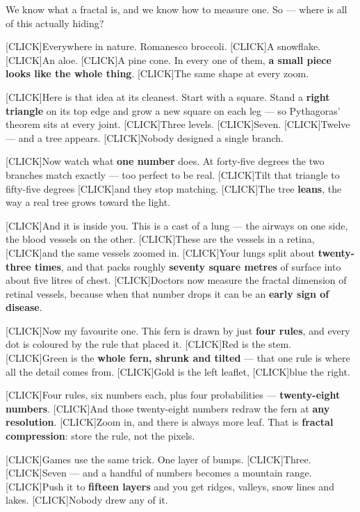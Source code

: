 \documentclass[12pt,a4paper]{article}
\newcommand{\cue}{\textcolor{RayColor}{\textsf{\footnotesize[CLICK]}}\hspace{0.3em}}
\newcommand{\stress}[1]{\textbf{#1}}
\begin{document}
\vspace{0.3cm}

We know what a fractal is, and we know how to measure one. So --- where is all of
this actually hiding?

\cue Everywhere in nature. Romanesco broccoli. \cue A snowflake. \cue An aloe.
\cue A pine cone. In every one of them, \stress{a small piece looks like the whole
thing}. \cue The same shape at every zoom.

\cue Here is that idea at its cleanest. Start with a square. Stand a
\stress{right triangle} on its top edge and grow a new square on each leg --- so
Pythagoras' theorem sits at every joint. \cue Three levels. \cue Seven.
\cue Twelve --- and a tree appears. \cue Nobody designed a single branch.

\cue Now watch what \stress{one number} does. At forty-five degrees the two
branches match exactly --- too perfect to be real. \cue Tilt that triangle to
fifty-five degrees \cue and they stop matching. \cue The tree \stress{leans}, the
way a real tree grows toward the light.

\cue And it is inside you. This is a cast of a lung --- the airways on one side,
the blood vessels on the other. \cue These are the vessels in a retina,
\cue and the same vessels zoomed in. \cue Your lungs split about
\stress{twenty-three times}, and that packs roughly \stress{seventy square metres}
of surface into about five litres of chest. \cue Doctors now measure the fractal
dimension of retinal vessels, because when that number drops it can be an
\stress{early sign of disease}.

\cue Now my favourite one. This fern is drawn by just \stress{four rules}, and
every dot is coloured by the rule that placed it. \cue Red is the stem.
\cue Green is the \stress{whole fern, shrunk and tilted} --- that one rule is
where all the detail comes from. \cue Gold is the left leaflet, \cue blue the
right.

\cue Four rules, six numbers each, plus four probabilities --- \stress{twenty-eight
numbers}. \cue And those twenty-eight numbers redraw the fern at \stress{any
resolution}. \cue Zoom in, and there is always more leaf. That is \stress{fractal
compression}: store the rule, not the pixels.

\cue Games use the same trick. One layer of bumps. \cue Three. \cue Seven --- and
a handful of numbers becomes a mountain range. \cue Push it to \stress{fifteen
layers} and you get ridges, valleys, snow lines and lakes. \cue Nobody drew any of
it.
\end{document}
